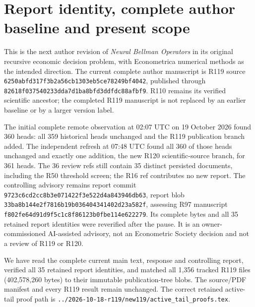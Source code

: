 \section{Report identity, complete author baseline and present scope}
This is the next author revision of \emph{Neural Bellman Operators} in its original recursive economic decision problem, with Econometrica numerical methods as the intended direction. The current complete author manuscript is R119 source \nolinkurl{6250abfd317f3b2a56cb1303eb5ce78249bf4042}, published through \nolinkurl{82618f037540233dda7d1ba8bfd3ddfdc88afbf9}. R110 remains its verified scientific ancestor; the completed R119 manuscript is not replaced by an earlier baseline or by a larger version label.

The initial complete remote observation at 02:07 UTC on 19 October 2026 found 360 heads: all 359 historical heads unchanged and the R119 publication branch added. The independent refresh at 07:48 UTC found all 360 of those heads unchanged and exactly one addition, the new R120 scientific-source branch, for 361 heads. The 36 review refs still contain 35 distinct persisted documents, including the R50 threshold screen; the R16 ref contributes no new report. The controlling advisory remains report commit \nolinkurl{9723c6cd2cc8b3e071422f3e522d4a843946db63}, report blob \nolinkurl{33ba8b144e2f7816b19b036404341402d23a582f}, assessing R97 manuscript \nolinkurl{f802fe64d91d9f5c1c8f86123b0fbe114e622279}. Its complete bytes and all 35 retained report identities were reverified after the pause. It is an owner-commissioned AI-assisted advisory, not an Econometric Society decision and not a review of R119 or R120.

We have read the complete current main text, response and controlling report, verified all 35 retained report identities, and matched all 1,356 tracked R119 files (402,578,260 bytes) to their immutable publication-tree blobs. The source/PDF manifest and every R119 result remain unchanged. The correct retained active-tail proof path is \nolinkurl{../2026-10-18-r119/new119/active_tail_proofs.tex}.


